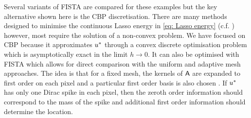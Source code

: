\documentclass[smallextended]{svjour3}
\newcommand{\1}{\F{1}}
\newcommand*{\varf}[1]{%
	\IfEqCase{#1}{%
		{0}{u}%
		{1}{v}%
		{2}{w}%
	}[u#1]%
}
\newcommand{\meshsize}{h}
\newcommand{\edit}[2]{{\ifmmode\text{\color{red}\sout{\ensuremath{#1}}}\else {\color{red} \sout{#1}}\fi} {\color{darkgreen} #2}}
\begin{document}
	Several variants of FISTA are compared for these examples but the key alternative shown here is the CBP discretisation. There are many methods designed to minimise the continuous Lasso energy in \eqref{eq: Lasso energy} (c.f. \cite{Bredies2013,Castro2016,Boyd2017,Catala2019}) however, most \edit{}{require} the solution of a non-convex problem. We have focused on CBP because it approximates $\varf0^*$ through a convex discrete optimisation problem which is asymptotically exact in the limit $\meshsize\to0$. It can also be optimised with FISTA which allows for direct comparison with the uniform and adaptive mesh approaches. The idea is that for a fixed mesh, the kernels of $\mathsf{A}$ are expanded to first order on each pixel and a particular first order basis is also chosen \cite{Ekanadham2011,Duval2017b}. If $\varf0^*$ has only one Dirac spike in each pixel, then the zeroth order information should correspond to the mass of the spike and additional first order information should determine the location.
	
\end{document}
